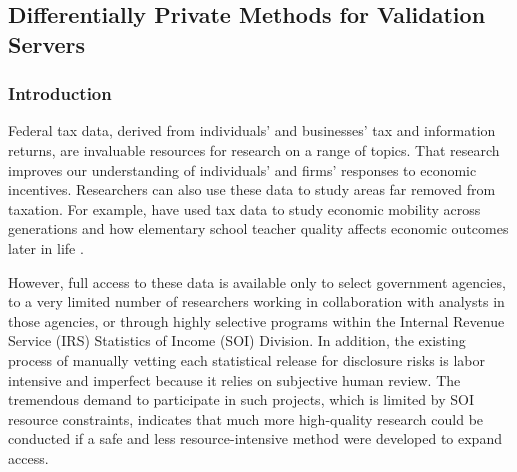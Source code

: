 
\fancyfoot{}


\begin{FlushLeft}
    \part{Differentially Private Methods for Validation Servers}
\end{FlushLeft}

\section{Introduction}\label{sec:intro}

Federal tax data, derived from individuals' and businesses' tax and information returns, are invaluable resources for research on a range of topics. That research improves our understanding of individuals' and firms' responses to economic incentives. Researchers can also use these data to study areas far removed from taxation. For example, \citet{chetty2014measuring} have used tax data to study economic mobility across generations and how elementary school teacher quality affects economic outcomes later in life \citep{chetty2011does}.

However, full access to these data is available only to select government agencies, to a very limited number of researchers working in collaboration with analysts in those agencies, or through highly selective programs within the Internal Revenue Service (IRS) Statistics of Income (SOI) Division. In addition, the existing process of manually vetting each statistical release for disclosure risks is labor intensive and imperfect because it relies on subjective human review. The tremendous demand to participate in such projects, which is limited by SOI resource constraints, indicates that much more high-quality research could be conducted if a safe and less resource-intensive method were developed to expand access.


